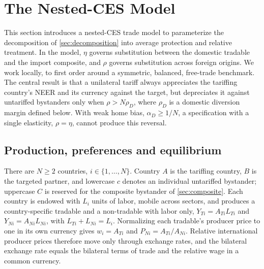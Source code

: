 \section{The Nested-CES Model}
\label{sec:nestedces}

This section introduces a nested-CES trade model to parameterize the decomposition of \cref{sec:decomposition} into average protection and relative treatment. In the model, $\eta$ governs substitution between the domestic tradable and the import composite, and $\rho$ governs substitution across foreign origins. We work locally, to first order around a symmetric, balanced, free-trade benchmark. The central result is that a unilateral tariff always appreciates the tariffing country's NEER and its currency against the target, but depreciates it against untariffed bystanders only when $\rho>N\rho_D$, where $\rho_D$ is a domestic diversion margin defined below. With weak home bias, $\alpha_D\geq1/N$, a specification with a single elasticity, $\rho=\eta$, cannot produce this reversal.

\subsection{Production, preferences and equilibrium}
\label{sec:model}

There are $N\geq2$ countries, $i\in\{1,\dots,N\}$. Country $A$ is the tariffing country, $B$ is the targeted partner, and lowercase $c$ denotes an individual untariffed bystander; uppercase $C$ is reserved for the composite bystander of \cref{sec:composite}. Each country is endowed with $L_i$ units of labor, mobile across sectors, and produces a country-specific tradable and a non-tradable with labor only, $Y_{Ti}=A_{Ti}L_{Ti}$ and $Y_{Ni}=A_{Ni}L_{Ni}$, with $L_{Ti}+L_{Ni}=L_i$. Normalizing each tradable's producer price to one in its own currency gives $w_i=A_{Ti}$ and $P_{Ni}=A_{Ti}/A_{Ni}$. Relative international producer prices therefore move only through exchange rates, and the bilateral exchange rate equals the bilateral terms of trade and the relative wage in a common currency.

